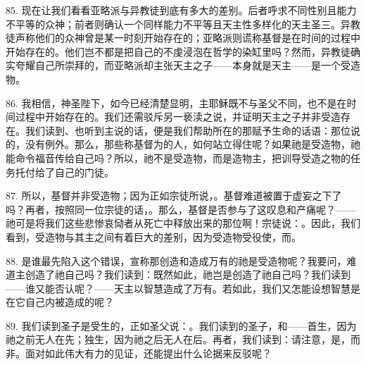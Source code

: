 85. 现在让我们看看亚略派与异教徒到底有多大的差别。后者呼求不同性别且能力不平等的众神；前者则确认一个同样能力不平等且天主性多样化的天主圣三。异教徒声称他们的众神曾是某一时刻开始存在的；亚略派则谎称基督是在时间的过程中开始存在的。他们岂不都是把自己的不虔浸泡在哲学的染缸里吗？然而，异教徒确实夸耀自己所崇拜的，而亚略派却主张天主之子——本身就是天主——是一个受造物。\par

\par

86. 我相信，神圣陛下，如今已经清楚显明，主耶稣既不与圣父不同，也不是在时间过程中开始存在的。我们还需驳斥另一亵渎之说，并证明天主之子并非受造存在。我们读到、也听到主说的话，便是我们帮助所在的那赋予生命的话语：那位说的，没有例外。那么，那些称基督为的人，如何站立得住呢？如果祂是受造物，祂能命令福音传给自己吗？所以，祂不是受造物，而是造物主，把训导受造之物的任务托付给了自己的门徒。\par

87. 所以，基督并非受造物；因为正如宗徒所说，。基督难道被置于虚妄之下了吗？再者，按照同一位宗徒的话，。那么，基督是否参与了这叹息和产痛呢？——祂可是将我们这些悲惨哀恸者从死亡中释放出来的那位啊！宗徒说：。因此，我们看到，受造物与其主之间有着巨大的差别，因为受造物受役使，而。\par

88. 是谁最先陷入这个错误，宣称那创造和造成万有的祂是受造物呢？我要问，难道主创造了祂自己吗？我们读到：既然如此，祂岂是创造了祂自己吗？我们读到——谁又能否认呢？——天主以智慧造成了万有。若如此，我们又怎能设想智慧是在它自己内被造成的呢？\par

89. 我们读到圣子是受生的，正如圣父说：。我们读到的圣子，和——首生，因为祂之前无人在先；独生，因为祂之后无人在后。再者，我们读到：请注意，是，而非。面对如此伟大有力的见证，还能提出什么论据来反驳呢？\par

